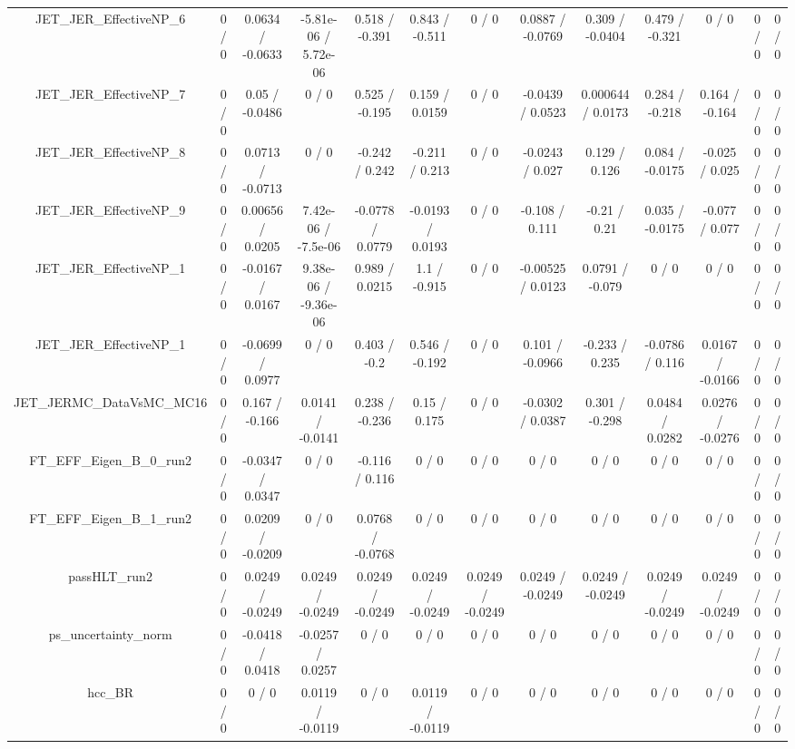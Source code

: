 \documentclass[10pt]{article}
\begin{document}
\begin{table}[htbp]
\begin{center}
\begin{tabular}{|c|c|c|c|c|c|c|c|c|c|c|c|c|}
  JET_JER_EffectiveNP_6 & 0 / 0 & 0.0634 / -0.0633 & -5.81e-06 / 5.72e-06 & 0.518 / -0.391 & 0.843 / -0.511 & 0 / 0 & 0.0887 / -0.0769 & 0.309 / -0.0404 & 0.479 / -0.321 & 0 / 0 & 0 / 0 & 0 / 0 \\ 
  JET_JER_EffectiveNP_7 & 0 / 0 & 0.05 / -0.0486 & 0 / 0 & 0.525 / -0.195 & 0.159 / 0.0159 & 0 / 0 & -0.0439 / 0.0523 & 0.000644 / 0.0173 & 0.284 / -0.218 & 0.164 / -0.164 & 0 / 0 & 0 / 0 \\ 
  JET_JER_EffectiveNP_8 & 0 / 0 & 0.0713 / -0.0713 & 0 / 0 & -0.242 / 0.242 & -0.211 / 0.213 & 0 / 0 & -0.0243 / 0.027 & 0.129 / 0.126 & 0.084 / -0.0175 & -0.025 / 0.025 & 0 / 0 & 0 / 0 \\ 
  JET_JER_EffectiveNP_9 & 0 / 0 & 0.00656 / 0.0205 & 7.42e-06 / -7.5e-06 & -0.0778 / 0.0779 & -0.0193 / 0.0193 & 0 / 0 & -0.108 / 0.111 & -0.21 / 0.21 & 0.035 / -0.0175 & -0.077 / 0.077 & 0 / 0 & 0 / 0 \\ 
  JET_JER_EffectiveNP_1 & 0 / 0 & -0.0167 / 0.0167 & 9.38e-06 / -9.36e-06 & 0.989 / 0.0215 & 1.1 / -0.915 & 0 / 0 & -0.00525 / 0.0123 & 0.0791 / -0.079 & 0 / 0 & 0 / 0 & 0 / 0 & 0 / 0 \\ 
  JET_JER_EffectiveNP_1 & 0 / 0 & -0.0699 / 0.0977 & 0 / 0 & 0.403 / -0.2 & 0.546 / -0.192 & 0 / 0 & 0.101 / -0.0966 & -0.233 / 0.235 & -0.0786 / 0.116 & 0.0167 / -0.0166 & 0 / 0 & 0 / 0 \\ 
  JET_JERMC_DataVsMC_MC16 & 0 / 0 & 0.167 / -0.166 & 0.0141 / -0.0141 & 0.238 / -0.236 & 0.15 / 0.175 & 0 / 0 & -0.0302 / 0.0387 & 0.301 / -0.298 & 0.0484 / 0.0282 & 0.0276 / -0.0276 & 0 / 0 & 0 / 0 \\ 
  FT_EFF_Eigen_B_0_run2 & 0 / 0 & -0.0347 / 0.0347 & 0 / 0 & -0.116 / 0.116 & 0 / 0 & 0 / 0 & 0 / 0 & 0 / 0 & 0 / 0 & 0 / 0 & 0 / 0 & 0 / 0 \\ 
  FT_EFF_Eigen_B_1_run2 & 0 / 0 & 0.0209 / -0.0209 & 0 / 0 & 0.0768 / -0.0768 & 0 / 0 & 0 / 0 & 0 / 0 & 0 / 0 & 0 / 0 & 0 / 0 & 0 / 0 & 0 / 0 \\ 
  passHLT_run2 & 0 / 0 & 0.0249 / -0.0249 & 0.0249 / -0.0249 & 0.0249 / -0.0249 & 0.0249 / -0.0249 & 0.0249 / -0.0249 & 0.0249 / -0.0249 & 0.0249 / -0.0249 & 0.0249 / -0.0249 & 0.0249 / -0.0249 & 0 / 0 & 0 / 0 \\ 
  ps_uncertainty_norm & 0 / 0 & -0.0418 / 0.0418 & -0.0257 / 0.0257 & 0 / 0 & 0 / 0 & 0 / 0 & 0 / 0 & 0 / 0 & 0 / 0 & 0 / 0 & 0 / 0 & 0 / 0 \\ 
  hcc_BR & 0 / 0 & 0 / 0 & 0.0119 / -0.0119 & 0 / 0 & 0.0119 / -0.0119 & 0 / 0 & 0 / 0 & 0 / 0 & 0 / 0 & 0 / 0 & 0 / 0 & 0 / 0 \\ 

\end{tabular}
\end{center}
\end{table}
\end{document}
